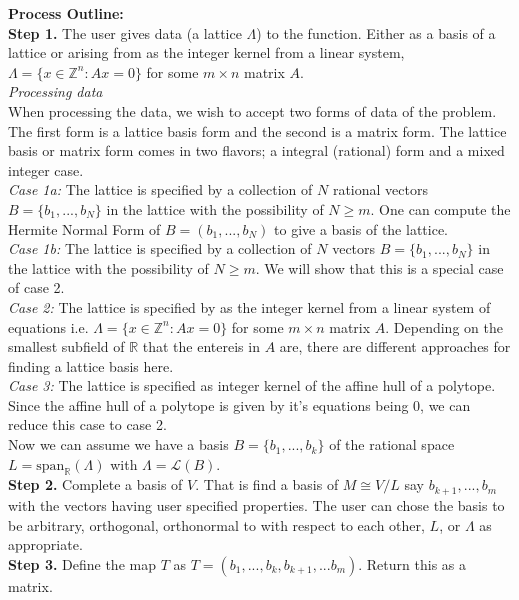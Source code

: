 \documentclass{article}
\newcommand{\nl}{\bigskip \\ } %
\renewcommand{\geq}{\geqslant}
\newcommand{\Z}[0]{\mathbb{Z}}		%
\newcommand{\R}[0]{\mathbb{R}}		%
\newcommand{\La}[0]{\mathcal L}
\theoremstyle{definition}
\theoremstyle{remark}
\begin{document}
\textbf{Process Outline:}\nl
\textbf{Step 1.} The user gives data (a lattice $\Lambda$) to the function.  Either as a basis of a lattice or arising from as the integer kernel from a linear system, $\Lambda = \{x\in \Z^n: Ax=0\}$ for some $m\times n$ matrix $A$. \nl %
\indent \textit{Processing data}\nl 
When processing the data, we wish to accept two forms of data of the problem. The first form is a lattice basis form and the second is a matrix form. The lattice basis or matrix form comes in two flavors; a integral (rational) form and a mixed integer case. \nl 
\indent \textit{Case 1a:} The lattice is specified by a collection of $N$ rational vectors $B= \{b_1,...,b_N\}$ in the lattice with the possibility of $N\geq m$. One can compute the Hermite Normal Form of $B =(b_1,...,b_N)$ to give a basis of the lattice.\nl
\indent \textit{Case 1b:} The lattice is specified by a collection of $N$ vectors $B= \{b_1,...,b_N\}$ in the lattice with the possibility of $N\geq m$. {\color{red} We will show that this is a special case of case 2.}\nl 
\indent \textit{Case 2:} The lattice is specified by as the integer kernel from a linear system of equations i.e. $\Lambda = \{x\in \Z^n: Ax=0\}$ for some $m\times n$ matrix $A$.%
Depending on the smallest subfield of $\R$ that the entereis in $A$ are, there are different approaches for finding a lattice basis here. \nl  %
{\color{red} \indent \textit{Case 3:} The lattice is specified as integer kernel of the affine hull of a polytope. Since the affine hull of a polytope is given by it's equations being 0, we can reduce this case to case 2. }\nl 

Now we can assume we have a basis $B= \{b_1,...,b_k\}$ of the rational space $L = \text{span}_\R(\Lambda)$ with $\Lambda = \La(B)$. \nl 
\textbf{Step 2.} Complete a basis of $V$. That is find a basis of $M\cong V/L$ say $b_{k+1},..., b_{m}$ with the vectors having user specified properties. The user can chose the basis to be arbitrary, orthogonal, orthonormal to with respect to each other, $L$, or $\Lambda$ as appropriate.  %
\nl 
\textbf{Step 3.} Define the map $T$ as $T = (b_1,...,b_k,b_{k+1},...b_m)$. Return this as a matrix.  \nl 
\end{document}
